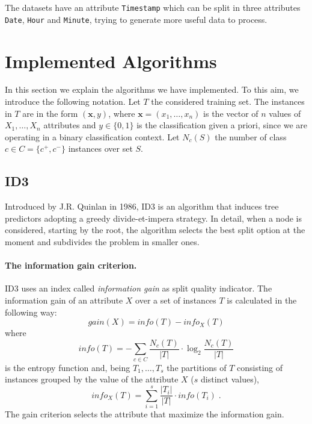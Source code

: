 \documentclass[12pt]{article}
\newcommand{\bx}{\bm x}
\begin{document}
The datasets have an attribute \texttt{Timestamp} which can be split in three attributes \texttt{Date}, \texttt{Hour} and \texttt{Minute}, trying to generate more useful data to process.

\newpage
\section{Implemented Algorithms}
In this section we explain the algorithms we have implemented.
To this aim, we introduce the following notation.
Let $T$ the considered training set.
The instances in $T$ are in the form $(\bx, y)$, where $\bx=(x_1, \dots, x_n)$ is the vector of $n$ values of $X_1, \dots, X_n$ attributes and $y \in \{0,1\}$ is the classification given a priori, since we are operating in a binary classification context.
Let $N_c(S)$ the number of class $c \in C = \{c^+, c^-\}$ instances over set $S$.

\subsection{ID3}
Introduced by J.R. Quinlan in 1986, ID3 \cite{ID3} is an algorithm that induces tree predictors adopting a greedy divide-et-impera strategy. In detail, when a node is considered, starting by the root, the algorithm selects the best split option at the moment and subdivides the problem in smaller ones.

\paragraph{The information gain criterion.} ID3 uses an index called \emph{information gain} as split quality indicator.
%
The information gain of an attribute $X$ over a set of instances $T$ is calculated in the following way:
\begin{equation}  \label{eq:id3_infogain}
    gain(X) = info(T) - info_X(T)
\end{equation}
where
\begin{equation} \label{eq:id3_info}
    info(T) = - \sum_{c \in C} \frac{N_c(T)}{|T|} \cdot \log_2 \frac{N_c(T)}{|T|}
\end{equation}
is the entropy function and, being $T_1, \dots, T_s$ the partitions of $T$ consisting of instances grouped by the value of the attribute $X$ ($s$ distinct values),
\begin{equation} \label{eq:id3_info_X}
    info_X(T)= \sum_{i=1}^s \frac{|T_i|}{|T|} \cdot info(T_i) \;.
\end{equation}
The gain criterion selects the attribute that maximize the information gain.
\end{document}
